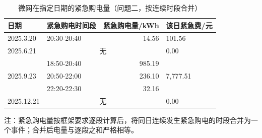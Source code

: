 \begin{table}[htbp]
  \centering
  \caption{微网在指定日期的紧急购电量（问题二，按连续时段合并）}
  \label{tab:p2-emg}
  \footnotesize
  \begin{tabular}{llrl}
    \toprule
    日期 & 紧急购电时间段 & 紧急购电量/kWh & 该日紧急费/元 \\
    \midrule
    \multirow{1}{*}{2025.3.20} & 20{:}30-20{:}40 & 14.56 & \multirow{1}{*}{101.56} \\
    \midrule
    2025.6.21 & \multicolumn{2}{c}{无} & 0.00 \\
    \multirow{3}{*}{2025.9.23} & 18{:}50-20{:}40 & 985.19 & \multirow{3}{*}{7,777.51} \\
     & 20{:}50-22{:}00 & 236.10 & \\
     & 22{:}20-22{:}30 & 32.16 & \\
    \midrule
    2025.12.21 & \multicolumn{2}{c}{无} & 0.00 \\
    \bottomrule
  \end{tabular}
  \par\vspace{2pt}
  \begin{minipage}{.92\textwidth}\footnotesize
    注：紧急购电量按框架要求逐段计算后，将同日连续发生紧急购电的时段合并为一个事件；合并后电量与逐段之和严格相等。
  \end{minipage}
\end{table}
